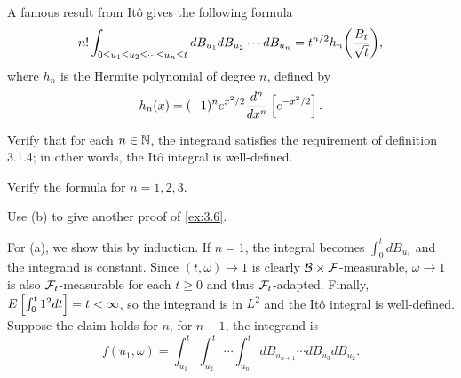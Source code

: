 \begin{exercise}{3.7}\label{ex:3.7}
    A famous result from It\^o gives the following formula
    \begin{equation*}
        n!\int_{0\leq u_1\leq u_2\leq\cdots\leq u_n\leq t} dB_{u_1}dB_{u_2}\cdots dB_{u_n} = t^{n/2}h_n\pth{\frac{B_t}{\sqrt{t}}}, 
    \end{equation*}
    where $h_n$ is the Hermite polynomial of degree $n$, defined by 
    \begin{equation*}
        h_n(x) = (-1)^ne^{x^2/2}\frac{d^n}{dx^n}\left[ {e^{-x^2/2}} \right].
    \end{equation*}
    \begin{thmenum}
        \item Verify that for each $n\in\mathbb{N}$, the integrand satisfies the requirement of
        definition 3.1.4; in other words, the It\^o integral is well-defined. 
        \item Verify the formula for $n=1, 2, 3$.
        \item Use (b) to give another proof of \cref{ex:3.6}. 
    \end{thmenum}
\end{exercise}
\begin{solution}
    For (a), we show this by induction. If $n = 1$, the integral becomes $\int_0^t dB_{u_1}$ 
    and the integrand is constant. Since $(t,\omega)\to 1$ is clearly $\mathcal{B}\times\mathcal{F}$-measurable, 
    $\omega\to 1$ is also $\mathcal{F}_t$-measurable for each $t\geq 0$ and thus $\mathcal{F}_t$-adapted. Finally, 
    $E\left[ {\int_0^t 1^2 dt} \right] = t < \infty$, so the integrand is in $L^2$ and the Itô integral is well-defined. 
    Suppose the claim holds for $n$, for $n+1$, the integrand is 
    \begin{equation*}
        f(u_1,\omega) = \int_{u_1}^t\int_{u_2}^t\cdots\int_{u_n}^t dB_{u_{n+1}}\cdots dB_{u_3}dB_{u_2}.
    \end{equation*}
\end{solution}
